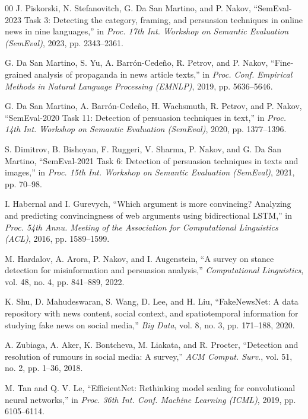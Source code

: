 \documentclass[conference]{IEEEtran}
\begin{document}
\begin{thebibliography}{00}
 J. Piskorski, N. Stefanovitch, G. Da San Martino, and P. Nakov, ``SemEval-2023 Task 3: Detecting the category, framing, and persuasion techniques in online news in nine languages,'' in \emph{Proc. 17th Int. Workshop on Semantic Evaluation (SemEval)}, 2023, pp. 2343--2361.

 G. Da San Martino, S. Yu, A. Barr\'{o}n-Cede\~{n}o, R. Petrov, and P. Nakov, ``Fine-grained analysis of propaganda in news article texts,'' in \emph{Proc. Conf. Empirical Methods in Natural Language Processing (EMNLP)}, 2019, pp. 5636--5646.

 G. Da San Martino, A. Barr\'{o}n-Cede\~{n}o, H. Wachsmuth, R. Petrov, and P. Nakov, ``SemEval-2020 Task 11: Detection of persuasion techniques in text,'' in \emph{Proc. 14th Int. Workshop on Semantic Evaluation (SemEval)}, 2020, pp. 1377--1396.

 S. Dimitrov, B. Bishoyan, F. Ruggeri, V. Sharma, P. Nakov, and G. Da San Martino, ``SemEval-2021 Task 6: Detection of persuasion techniques in texts and images,'' in \emph{Proc. 15th Int. Workshop on Semantic Evaluation (SemEval)}, 2021, pp. 70--98.

 I. Habernal and I. Gurevych, ``Which argument is more convincing? Analyzing and predicting convincingness of web arguments using bidirectional LSTM,'' in \emph{Proc. 54th Annu. Meeting of the Association for Computational Linguistics (ACL)}, 2016, pp. 1589--1599.

 M. Hardalov, A. Arora, P. Nakov, and I. Augenstein, ``A survey on stance detection for misinformation and persuasion analysis,'' \emph{Computational Linguistics}, vol. 48, no. 4, pp. 841--889, 2022.

 K. Shu, D. Mahudeswaran, S. Wang, D. Lee, and H. Liu, ``FakeNewsNet: A data repository with news content, social context, and spatiotemporal information for studying fake news on social media,'' \emph{Big Data}, vol. 8, no. 3, pp. 171--188, 2020.

 A. Zubiaga, A. Aker, K. Bontcheva, M. Liakata, and R. Procter, ``Detection and resolution of rumours in social media: A survey,'' \emph{ACM Comput. Surv.}, vol. 51, no. 2, pp. 1--36, 2018.

 M. Tan and Q. V. Le, ``EfficientNet: Rethinking model scaling for convolutional neural networks,'' in \emph{Proc. 36th Int. Conf. Machine Learning (ICML)}, 2019, pp. 6105--6114.


\end{thebibliography}
\end{document}
